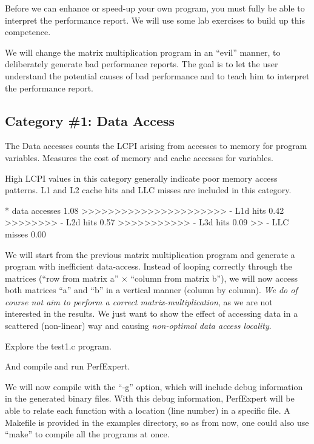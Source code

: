 Before we can enhance or speed-up your own program, you must fully be able to interpret the performance report. We will use some lab exercises to build up this competence.

We will change the matrix multiplication program in an ``evil'' manner, to deliberately generate bad performance reports. The goal is to let the user understand the potential causes of bad performance and to teach him to interpret the performance report.

\subsection{Category \#1: Data Access}
\label{subsec:CAT1_Data_Access}

The Data accesses counts the LCPI arising from accesses to memory for program variables. Measures the cost of memory and cache accesses for variables.

High LCPI values in this category generally indicate poor memory access patterns. L1 and L2 cache hits and LLC misses are included in this category.

\begin{prompt}
* data accesses          1.08 >>>>>>>>>>>>>>>>>>>>>>
  - L1d hits             0.42 >>>>>>>>
  - L2d hits             0.57 >>>>>>>>>>>
  - L3d hits             0.09 >>
  - LLC misses           0.00
\end{prompt}

We will start from the previous matrix multiplication program and generate a program with inefficient data-access. Instead of looping correctly through the matrices (``row from matrix a'' $\times$ ``column from matrix b''), we will now access both matrices ``a'' and ``b'' in a vertical manner (column by column). \emph{We do of course not aim to perform a correct matrix-multiplication}, as we are not interested in the results. We just want to show the effect of accessing data in a scattered (non-linear) way and causing \emph{non-optimal data access locality}.

Explore the test1.c program.

\begin{prompt}
\end{prompt}

And compile and run PerfExpert.

We will now compile with the ``-g'' option, which will include debug information in the generated binary files. With this debug information, PerfExpert will be able to relate each function with a location (line number) in a specific file. A Makefile is provided in the examples directory, so as from now, one could also use ``make'' to compile all the programs at once.

